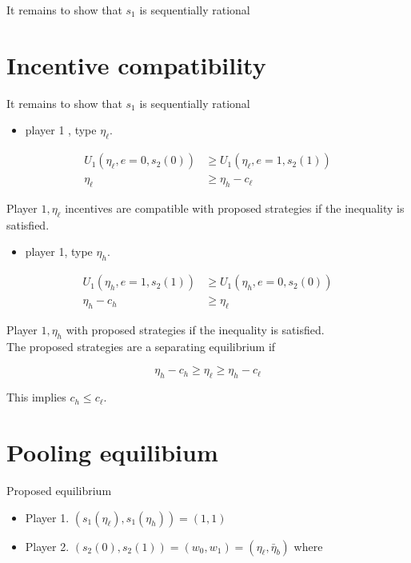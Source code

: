 \documentclass[10pt]{article}
\begin{document}
It remains to show that $s_{1}$ is sequentially rational

\section*{Incentive compatibility}
It remains to show that $s_{1}$ is sequentially rational

\begin{itemize}
  \item player 1 , type $\eta_{\ell}$.
\end{itemize}

$$
\begin{aligned}
U_{1}\left(\eta_{\ell}, e=0, s_{2}(0)\right) & \geq U_{1}\left(\eta_{\ell}, e=1, s_{2}(1)\right) \\
\eta_{\ell} & \geq \eta_{h}-c_{\ell}
\end{aligned}
$$

Player $1, \eta_{\ell}$ incentives are compatible with proposed strategies if the inequality is satisfied.

\begin{itemize}
  \item player 1, type $\eta_{h}$.
\end{itemize}

$$
\begin{aligned}
U_{1}\left(\eta_{h}, e=1, s_{2}(1)\right) & \geq U_{1}\left(\eta_{h}, e=0, s_{2}(0)\right) \\
\eta_{h}-c_{h} & \geq \eta_{\ell}
\end{aligned}
$$

Player $1, \eta_{h}$ with proposed strategies if the inequality is satisfied.\\
The proposed strategies are a separating equilibrium if

$$
\eta_{h}-c_{h} \geq \eta_{\ell} \geq \eta_{h}-c_{\ell}
$$

This implies $c_{h} \leq c_{\ell}$.

\section*{Pooling equilibium}
Proposed equilibrium

\begin{itemize}
  \item Player 1. $\left(s_{1}\left(\eta_{\ell}\right), s_{1}\left(\eta_{h}\right)\right)=(1,1)$
  \item Player 2. $\left(s_{2}(0), s_{2}(1)\right)=\left(w_{0}, w_{1}\right)=\left(\eta_{\ell}, \bar{\eta}_{b}\right)$ where
\end{itemize}
\end{document}

